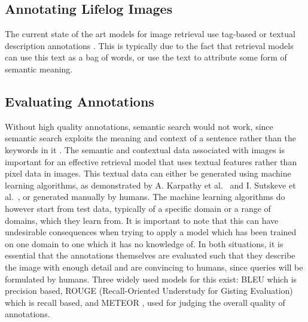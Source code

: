 \subsection{Annotating Lifelog Images}
The current state of the art models for image retrieval use tag-based or textual description annotations \cite{ali2010semantically}. This is typically due to the fact that retrieval models can use this text as a bag of words, or use the text to attribute some form of semantic meaning.

\subsection{Evaluating Annotations}
Without high quality annotations, semantic search would not work, since semantic search exploits the meaning and context of a sentence rather than the keywords in it \cite{ali2010semantically}. The semantic and contextual data associated with images is important for an effective retrieval model that uses textual features rather than pixel data in images. This textual data can either be generated using machine learning algorithms, as demonstrated by A. Karpathy et al.~\cite{karpathy2015deep} and  I. Sutskeve et al.~\cite{sutskever2011generating}, or generated manually by humans. The machine learning algorithms do however start from test data, typically of a specific domain or a range of domains, which they learn from. It is important to note that this can have undesirable consequences when trying to apply a model which has been trained on one domain to one which it has no knowledge of. In both situations, it is essential that the annotations themselves are evaluated such that they describe the image with enough detail and are convincing to humans, since queries will be formulated by humans. Three widely used models for this exist: BLEU \cite{papineni2002bleu} which is precision based, ROUGE (Recall-Oriented Understudy for Gisting Evaluation) \cite{lin2004rouge} which is recall based, and METEOR \cite{elliott2013image}, used for judging the overall quality of annotations.

